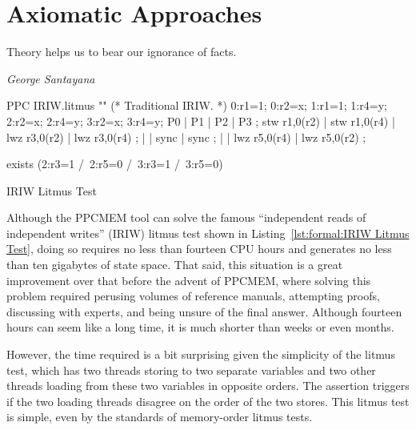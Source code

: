 
\section{Axiomatic Approaches}
\label{sec:formal:Axiomatic Approaches}
%
\epigraph{Theory helps us to bear our ignorance of facts.}
	{\emph{George Santayana}}

\begin{listing}[tb]
\begin{fcvlabel}
\begin{VerbatimL}[commandchars=\%\@\$]
PPC IRIW.litmus
""
(* Traditional IRIW. *)
{
0:r1=1; 0:r2=x;
1:r1=1;         1:r4=y;
        2:r2=x; 2:r4=y;
        3:r2=x; 3:r4=y;
}
P0           | P1           | P2           | P3           ;
stw r1,0(r2) | stw r1,0(r4) | lwz r3,0(r2) | lwz r3,0(r4) ;
             |              | sync         | sync         ;
             |              | lwz r5,0(r4) | lwz r5,0(r2) ;

exists
(2:r3=1 /\ 2:r5=0 /\ 3:r3=1 /\ 3:r5=0)
\end{VerbatimL}
\end{fcvlabel}
\caption{IRIW Litmus Test}
\label{lst:formal:IRIW Litmus Test}
\end{listing}

Although the PPCMEM tool can solve the famous ``independent reads of
independent writes'' (IRIW) litmus test shown in
Listing~\ref{lst:formal:IRIW Litmus Test}, doing so requires no less than
fourteen CPU hours and generates no less than ten gigabytes of state space.
That said, this situation is a great improvement over that before the advent
of PPCMEM, where solving this problem required perusing volumes of
reference manuals, attempting proofs, discussing with experts, and
being unsure of the final answer.
Although fourteen hours can seem like a long time, it is much shorter
than weeks or even months.

However, the time required is a bit surprising given the simplicity
of the litmus test, which has two threads storing to two separate variables
and two other threads loading from these two variables in opposite
orders.
The assertion triggers if the two loading threads disagree on the order
of the two stores.
This litmus test is simple, even by the standards of memory-order litmus
tests.

